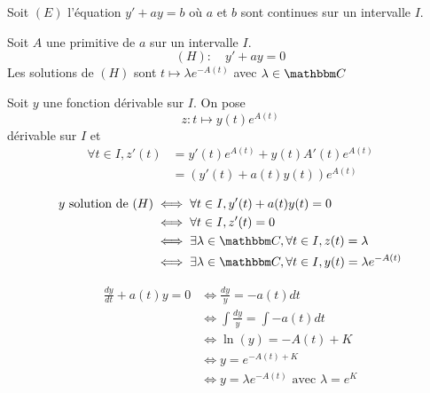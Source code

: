 \part{}

Soit $(E)$ l'équation $y' + ay = b$  où $a$ et $b$ sont continues sur un intervalle $I$.\\

\begin{prop}
	Soit $A$ une primitive de $a$ sur un intervalle $I$. \[
		(H): \quad y' + ay = 0
	\] Les solutions de $(H)$ sont $t \mapsto \lambda e^{-A(t)}$ avec $\lambda \in \C$
\end{prop}

\begin{prv}
	Soit $y$ une fonction dérivable sur $I$. On pose \[
		z: t \mapsto y(t) e^{A(t)}
	\] dérivable sur $I$ et
	\begin{align*}
		\forall t \in I, z'(t)
		&= y'(t)e^{A(t)} + y(t)A'(t) e^{A(t)} \\
		&= \left( y'(t) + a(t)y(t) \right) e^{A(t)} \\
	\end{align*}
	\vspace{1mm}
	\begin{align*}
		y \text{ solution de } (H) &\iff \forall t \in I, y'(t) + a(t) y(t) = 0\\
															 &\iff \forall t \in I, z'(t) = 0\\
															 &\iff \exists \lambda \in \C, \forall t \in I, z(t) = \lambda\\
															 &\iff \exists \lambda\in \C, \forall t\in I, y(t) = \lambda e^{-A(t)}
	\end{align*}
\end{prv}

\begin{rmk}
	\begin{align*}
		\frac{dy}{dt} + a(t) y = 0
		&\iff \frac{dy}{y} = -a(t) dt\\
		&\iff \int \frac{dy}{y} = \int -a(t) dt\\
		&\iff \ln(y) = -A(t) + K\\
		&\iff y = e^{-A(t) + K}\\
		&\iff y = \lambda e^{-A(t)} \text{ avec } \lambda = e^{K}
	\end{align*}
\end{rmk}


